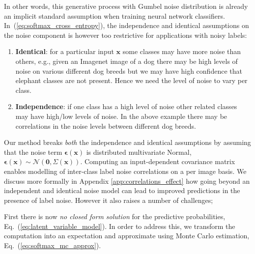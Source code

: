 \documentclass[final]{cvpr}
\begin{document}
In other words, this generative process with Gumbel noise distribution is already an implicit standard assumption when training neural network classifiers. In~(\ref{eq:softmax_cross_entropy}), the independence and identical assumptions on the noise component is however too restrictive for applications with noisy labels:
\begin{enumerate}
    \item \textbf{Identical}: for a particular input $\mathbf{x}$ some classes may have more noise than others, e.g., given an Imagenet image of a dog there may be high levels of noise on various different dog breeds but we may have high confidence that elephant classes are not present. Hence we need the level of noise to vary per class.
    \item \textbf{Independence}: if one class has a high level of noise other related classes may have high/low levels of noise. In the above example there may be correlations in the noise levels between different dog breeds.
\end{enumerate}

Our method breaks \emph{both} the independence and identical assumptions by assuming that the noise term $\boldsymbol{\epsilon}(\mathbf{x})$ is distributed multivariate Normal, $\boldsymbol{\epsilon}(\mathbf{x}) \sim \mathcal{N}(\mathbf{0}, \Sigma(\mathbf{x}))$. Computing an input-dependent covariance matrix enables modelling of inter-class label noise correlations on a per image basis. We discuss more formally in Appendix \ref{app:correlations_effect} how going beyond an independent and identical noise model can lead to improved predictions in the presence of label noise. However it also raises a number of challenges;

First there is now \textit{no closed form solution} for the predictive probabilities, Eq.\ (\ref{eq:latent_variable_model}). In order to address this, we transform the computation into an expectation and approximate using Monte Carlo estimation, Eq.\ (\ref{eq:softmax_mc_approx}).
\end{document}
